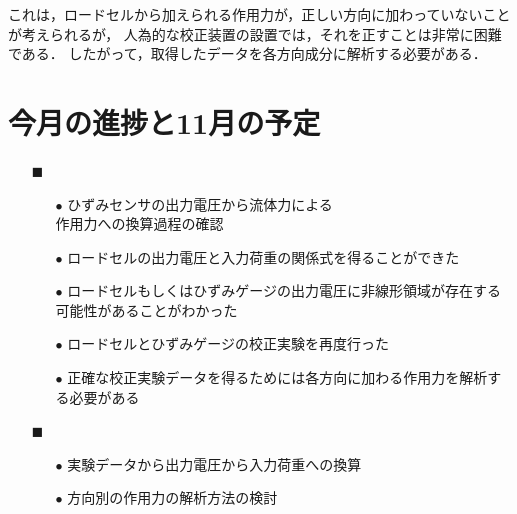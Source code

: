 \documentclass[twocolumn,a4j]{jsarticle}
\begin{document}
これは，ロードセルから加えられる作用力が，正しい方向に加わっていないことが考えられるが，
人為的な校正装置の設置では，それを正すことは非常に困難である．
したがって，取得したデータを各方向成分に解析する必要がある．

\newpage
\section{今月の進捗と11月の予定}
\begin{itemize}
    \item [$\blacksquare$] 
          \begin{itemize}
              \item [$\bullet$] ひずみセンサの出力電圧から流体力による\\
                    作用力への換算過程の確認
              \item [$\bullet$] ロードセルの出力電圧と入力荷重の関係式を得ることができた
              \item [$\bullet$] ロードセルもしくはひずみゲージの出力電圧に非線形領域が存在する可能性があることがわかった
              \item [$\bullet$] ロードセルとひずみゲージの校正実験を再度行った
              \item [$\bullet$] 正確な校正実験データを得るためには各方向に加わる作用力を解析する必要がある\\
          \end{itemize}
    \item [$\blacksquare$] 
          \begin{itemize}
              \item [$\bullet$] 実験データから出力電圧から入力荷重への換算
              \item [$\bullet$] 方向別の作用力の解析方法の検討\\
          \end{itemize}
\end{itemize}
\end{document}
